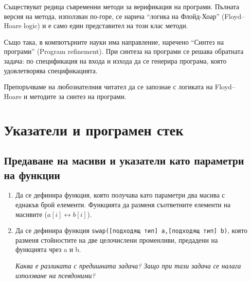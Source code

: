 {\begin{enumerate}[resume]
\end{enumerate}

\begin{mdframed}[hidealllines=true,backgroundcolor=gray!20]
Съществуват редица съвременни методи за верификация на програми. Пълната версия на метода, използван по-горе, се нарича ``логика на Флойд-Хоар'' (Floyd–Hoare logic) и е само един представител на този клас методи.

Също така, в компютърните науки има направление, наречено ``Синтез на програми'' (Program refinement). При синтеза на програми се решава обратната задача: по спецификация на входа и изхода да се генерира програма, която удовлетворява спецификацията.

Препоръчваме на любознателния читател да се запознае с логиката на Floyd–Hoare и методите за синтез на програми.
\end{mdframed}

\pagebreak

\clearpage\section{Указатели и програмен стек}

\subsection {Предаване на масиви и указатели като параметри на функции}
\begin{enumerate}
  \item Да се дефинира функция, която получава като параметри два масива с еднакъв брой елементи. Функцията да разменя съответните елементи на масивите ($a[i] \leftrightarrow b[i]$).
  \item Да се дефинира функция \texttt{swap([подходящ тип] a,[подходящ тип] b)}, която разменя стойностите на две целочислени променливи, предадени на функцията чрез a и b.

  \emph{Каква е разликата с предишната задача? Защо при тази задача се налага използване на псевдоними?}
\end{enumerate}

}
